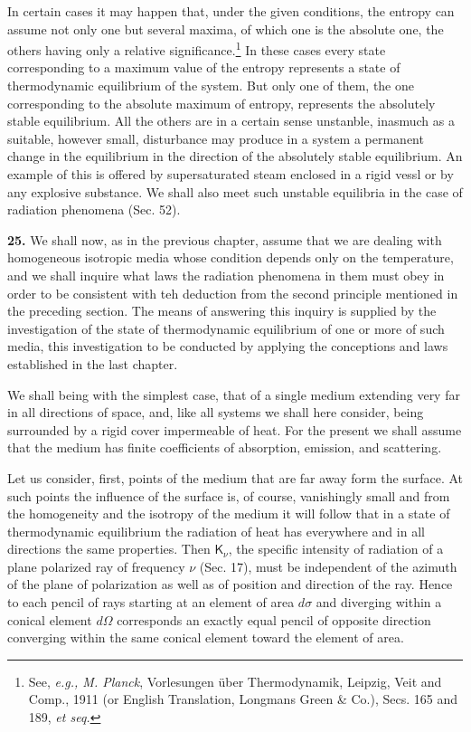 \documentclass[12pt,oneside]{book}
\begin{document}
In certain cases it may happen that, under the given conditions, the entropy can assume not only one but several maxima, of which one is the absolute one, the others having only a relative significance.\footnote{See, \textit{e.g., M. Planck}, Vorlesungen \"uber Thermodynamik, Leipzig, Veit and Comp., 1911 (or English Translation, Longmans Green \& Co.), Secs. 165 and 189, \textit{et seq.}} In these cases every state corresponding to a maximum value of the entropy represents a state of thermodynamic equilibrium of the system. But only one of them, the one corresponding to the absolute maximum of entropy, represents the absolutely stable equilibrium. All the others are in a certain sense unstanble, inasmuch as a suitable, however small, disturbance may produce in a system a permanent change in the equilibrium in the direction of the absolutely stable equilibrium. An example of this is offered by supersaturated steam enclosed in a rigid vessl or by any explosive substance. We shall also meet such unstable equilibria in the case of radiation phenomena (Sec. 52). \par 

\textbf{25.} We shall now, as in the previous chapter, assume that we are dealing with homogeneous isotropic media whose condition depends only on the temperature, and we shall inquire what laws the radiation phenomena in them must obey in order to be consistent with teh deduction from the second principle mentioned in the preceding section. The means of answering this inquiry is supplied by the investigation of the state of thermodynamic equilibrium of one or more of such media, this investigation to be conducted by applying the conceptions and laws established in the last chapter. \par 

We shall being with the simplest case, that of a single medium extending very far in all directions of space, and, like all systems we shall here consider, being surrounded by a rigid cover impermeable of heat. For the present we shall assume that the medium has finite coefficients of absorption, emission, and scattering. \par 

Let us consider, first, points of the medium that are far away form the surface. At such points the influence of the surface is, of course, vanishingly small and from the homogeneity and the isotropy of the medium it will follow that in a state of thermodynamic equilibrium the radiation of heat has everywhere and in all directions the same properties. Then $\mathsf{K}_\nu$, the specific intensity of radiation of a plane polarized ray of frequency $\nu$ (Sec. 17), must be independent of the azimuth of the plane of polarization as well as of position and direction of the ray. Hence to each pencil of rays starting at an element of area $d\sigma$ and diverging within a conical element $d\Omega$ corresponds an exactly equal pencil of opposite direction converging within the same conical element toward the element of area. \par 
\end{document}
